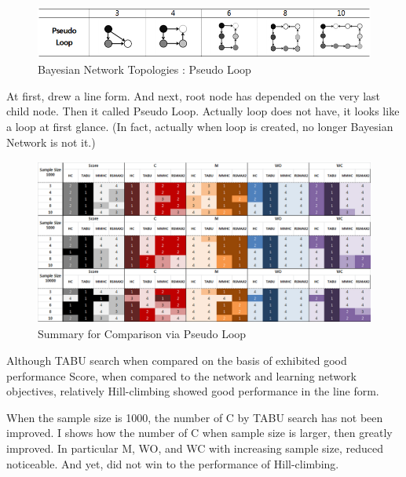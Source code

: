 	\begin{figure}[h]
	\centering
		\includegraphics[height=50pt]{images/Topologies_PseudoLoop}
		\caption{Bayesian Network Topologies : Pseudo Loop}
	\end{figure}	

	At first, drew a line form. And next, root node has depended on the very last child node. Then it called Pseudo Loop. Actually loop does not have, it looks like a loop at first glance. (In fact, actually when loop is created, no longer Bayesian Network is not it.)

\begin{figure}[!bhp]
	\centering
		\includegraphics[height=155pt]{images/Result_PseudoLoop}
		\caption{Summary for Comparison via Pseudo Loop}
	\end{figure}	

Although TABU search when compared on the basis of exhibited good performance Score, when compared to the network and learning network objectives, relatively Hill-climbing showed good performance in the line form.

When the sample size is 1000, the number of C by TABU search has not been improved. I shows how the number of C when sample size is larger, then greatly improved. In particular M, WO, and WC with increasing sample size, reduced noticeable. And yet, did not win to the performance of Hill-climbing.

